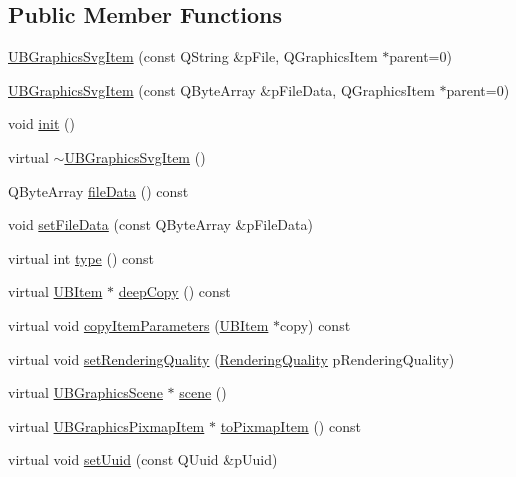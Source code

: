 \subsection*{Public Member Functions}
\begin{DoxyCompactItemize}
\item 
\hyperlink{class_u_b_graphics_svg_item_a47ac7a4adf4bb678692aa98cc30809bf}{U\-B\-Graphics\-Svg\-Item} (const Q\-String \&p\-File, Q\-Graphics\-Item $\ast$parent=0)
\item 
\hyperlink{class_u_b_graphics_svg_item_adba664bd89f8955a34c420db86f6828c}{U\-B\-Graphics\-Svg\-Item} (const Q\-Byte\-Array \&p\-File\-Data, Q\-Graphics\-Item $\ast$parent=0)
\item 
void \hyperlink{class_u_b_graphics_svg_item_aefe5ca00c7f91a56938b35611149a779}{init} ()
\item 
virtual \hyperlink{class_u_b_graphics_svg_item_a48d357b94ce6d3b55942723b32d85cc8}{$\sim$\-U\-B\-Graphics\-Svg\-Item} ()
\item 
Q\-Byte\-Array \hyperlink{class_u_b_graphics_svg_item_aa5c2b14a2d193b26cbb03952e37698cf}{file\-Data} () const 
\item 
void \hyperlink{class_u_b_graphics_svg_item_afff88829fc9967ca9e0cb29e5be7e598}{set\-File\-Data} (const Q\-Byte\-Array \&p\-File\-Data)
\item 
virtual int \hyperlink{class_u_b_graphics_svg_item_a3729377711790e19d2b2ad64ed7b0acd}{type} () const 
\item 
virtual \hyperlink{class_u_b_item}{U\-B\-Item} $\ast$ \hyperlink{class_u_b_graphics_svg_item_a312cf73a521c514c48a0e866771ba75e}{deep\-Copy} () const 
\item 
virtual void \hyperlink{class_u_b_graphics_svg_item_a467ce14bcf2b4c27a01ab128c6149b1c}{copy\-Item\-Parameters} (\hyperlink{class_u_b_item}{U\-B\-Item} $\ast$copy) const 
\item 
virtual void \hyperlink{class_u_b_graphics_svg_item_af9482489d2553eef2d4223a6faab6188}{set\-Rendering\-Quality} (\hyperlink{class_u_b_item_a4d073757053cafbe4f26c17ea1224d53}{Rendering\-Quality} p\-Rendering\-Quality)
\item 
virtual \hyperlink{class_u_b_graphics_scene}{U\-B\-Graphics\-Scene} $\ast$ \hyperlink{class_u_b_graphics_svg_item_a92e88b5e4e6214adcd9ac0feeae07cde}{scene} ()
\item 
virtual \hyperlink{class_u_b_graphics_pixmap_item}{U\-B\-Graphics\-Pixmap\-Item} $\ast$ \hyperlink{class_u_b_graphics_svg_item_a0d1b06f4717d38207ff6bc070ed9cb5e}{to\-Pixmap\-Item} () const 
\item 
virtual void \hyperlink{class_u_b_graphics_svg_item_ad775cde3b5bbedde62e7e3c0dda06dd1}{set\-Uuid} (const Q\-Uuid \&p\-Uuid)
\end{DoxyCompactItemize}
